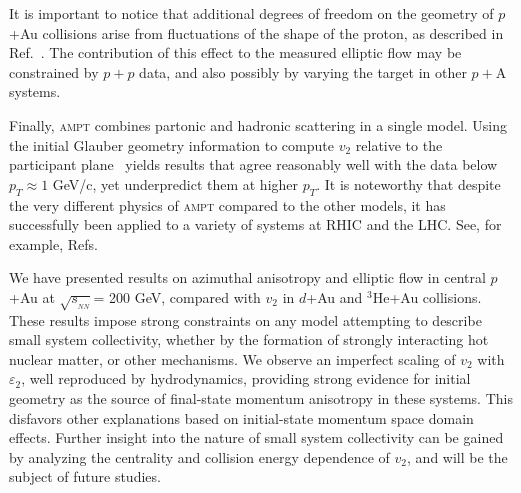 \documentclass[%
reprint,
showpacs,preprintnumbers,
 amsmath,amssymb,
 aps,
]{revtex4-1}
\newcommand{\pt}{\mbox{$p_T$}\xspace}
\newcommand{\sqsn}{\mbox{$\sqrt{s_{_{NN}}}$}\xspace}
\newcommand{\dau}{\mbox{$d$+Au}\xspace}
\newcommand{\pau}{\mbox{$p$+Au}\xspace}
\newcommand{\hau}{\mbox{$^3\text{He}$+Au}\xspace}
\begin{document}
It is important to notice that additional degrees of freedom on the geometry of \pau collisions arise from fluctuations of the shape of the proton, as described in Ref.~\cite{Schlichting:2014ipa}. The contribution of this effect to the measured elliptic flow may be constrained by $p+p$ data, and also possibly by varying the target in other $p+$A systems.

Finally, \textsc{ampt} combines partonic and hadronic scattering in a single model. Using the initial Glauber geometry information to compute $v_2$ relative to the participant plane~\cite{Koop:2015wea} yields results that agree reasonably well with the data below $\pt \approx 1$ GeV/c, yet underpredict them at higher \pt. It is noteworthy that despite the very different physics of \textsc{ampt} compared to the other models, it has successfully been applied to a variety of systems at RHIC and the LHC. See, for example, Refs.~\cite{Adare:2015cpn,Koop:2015wea,Ma:2016fve,ma_long-range_2014,ma_long-range_2014}

We have presented results on azimuthal anisotropy and elliptic flow in central \pau at \sqsn = 200 GeV, compared with $v_2$ in \dau and \hau collisions. These results impose strong constraints on any model attempting to describe small system collectivity, whether by the formation of strongly interacting hot nuclear matter, or other mechanisms. We observe an imperfect scaling of $v_2$ with $\varepsilon_2$, well reproduced by hydrodynamics, providing strong evidence for initial geometry as the source of final-state momentum anisotropy in these systems. This disfavors other explanations based on initial-state momentum space domain effects. Further insight into the nature of small system collectivity can be gained by analyzing the centrality and collision energy dependence of $v_2$, and will be the subject of future studies. 


\end{document}
